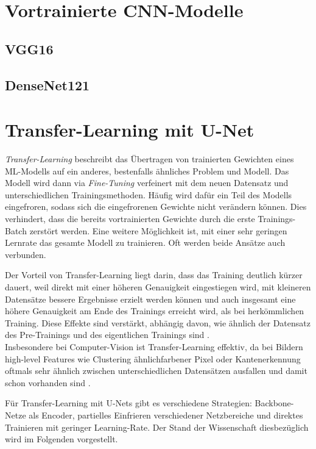 \section{Vortrainierte \ac{CNN}-Modelle}

\subsection{VGG16}

\subsection{DenseNet121}


\section{Transfer-Learning mit U-Net}

\textit{Transfer-Learning} beschreibt das Übertragen von trainierten Gewichten eines \ac{ML}-Modells auf ein anderes, 
bestenfalls ähnliches Problem und Modell. Das Modell wird dann via \textit{Fine-Tuning} verfeinert mit dem neuen Datensatz und unterschiedlichen Trainingsmethoden.
Häufig wird dafür ein Teil des Modells eingefroren, sodass sich die eingefrorenen Gewichte nicht verändern können. Dies verhindert, 
dass die bereits vortrainierten Gewichte durch die erste Trainings-Batch zerstört werden. Eine weitere Möglichkeit ist,
mit einer sehr geringen Lernrate das gesamte Modell zu trainieren. Oft werden beide Ansätze auch verbunden.

Der Vorteil von Transfer-Learning liegt darin, dass das Training deutlich kürzer dauert, 
weil direkt mit einer höheren Genauigkeit eingestiegen wird, mit kleineren Datensätze bessere Ergebnisse erzielt werden können
 und auch insgesamt eine höhere Genauigkeit 
am Ende des Trainings erreicht wird, als bei herkömmlichen Training. Diese Effekte sind verstärkt, 
abhängig davon, wie ähnlich der Datensatz des Pre-Trainings und des eigentlichen Trainings sind \cite{Ruder.3212017}. \\
Insbesondere bei Computer-Vision ist Transfer-Learning effektiv, da bei Bildern high-level Features wie Clustering 
ähnlichfarbener Pixel oder Kantenerkennung oftmals sehr ähnlich zwischen unterschiedlichen Datensätzen ausfallen 
und damit schon vorhanden sind \cite{Ruder.3212017}. 

Für Transfer-Learning mit U-Nets gibt es verschiedene Strategien: Backbone-Netze als Encoder, 
partielles Einfrieren verschiedener Netzbereiche und direktes Trainieren mit geringer Learning-Rate.
Der Stand der Wissenschaft diesbezüglich wird im Folgenden vorgestellt. 

